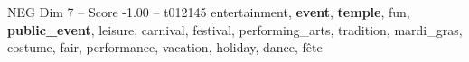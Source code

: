 \begin{textsample}{NEG Dim 7 – Score -1.00 – t012145}  \label{ex:f7_neg_036}
entertainment, \textbf{event}, \textbf{temple}, fun, \textbf{public\_event}, leisure, carnival, festival, performing\_arts, tradition, mardi\_gras, costume, fair, performance, vacation, holiday, dance, fête

\end{textsample}
